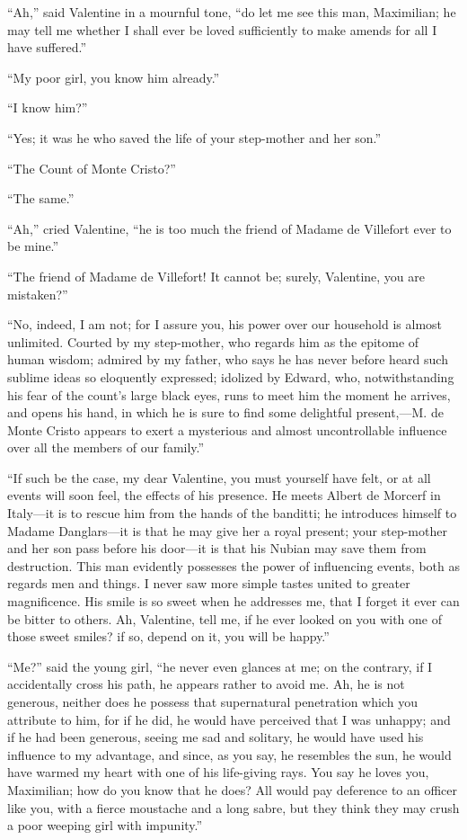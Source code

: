 “Ah,” said Valentine in a mournful tone, “do let me see this man,
Maximilian; he may tell me whether I shall ever be loved sufficiently
to make amends for all I have suffered.”

“My poor girl, you know him already.”

“I know him?”

“Yes; it was he who saved the life of your step-mother and her son.”

“The Count of Monte Cristo?”

“The same.”

“Ah,” cried Valentine, “he is too much the friend of Madame de
Villefort ever to be mine.”

“The friend of Madame de Villefort! It cannot be; surely, Valentine,
you are mistaken?”

“No, indeed, I am not; for I assure you, his power over our household
is almost unlimited. Courted by my step-mother, who regards him as the
epitome of human wisdom; admired by my father, who says he has never
before heard such sublime ideas so eloquently expressed; idolized by
Edward, who, notwithstanding his fear of the count’s large black eyes,
runs to meet him the moment he arrives, and opens his hand, in which he
is sure to find some delightful present,—M. de Monte Cristo appears to
exert a mysterious and almost uncontrollable influence over all the
members of our family.”

“If such be the case, my dear Valentine, you must yourself have felt,
or at all events will soon feel, the effects of his presence. He meets
Albert de Morcerf in Italy—it is to rescue him from the hands of the
banditti; he introduces himself to Madame Danglars—it is that he may
give her a royal present; your step-mother and her son pass before his
door—it is that his Nubian may save them from destruction. This man
evidently possesses the power of influencing events, both as regards
men and things. I never saw more simple tastes united to greater
magnificence. His smile is so sweet when he addresses me, that I forget
it ever can be bitter to others. Ah, Valentine, tell me, if he ever
looked on you with one of those sweet smiles? if so, depend on it, you
will be happy.”

“Me?” said the young girl, “he never even glances at me; on the
contrary, if I accidentally cross his path, he appears rather to avoid
me. Ah, he is not generous, neither does he possess that supernatural
penetration which you attribute to him, for if he did, he would have
perceived that I was unhappy; and if he had been generous, seeing me
sad and solitary, he would have used his influence to my advantage, and
since, as you say, he resembles the sun, he would have warmed my heart
with one of his life-giving rays. You say he loves you, Maximilian; how
do you know that he does? All would pay deference to an officer like
you, with a fierce moustache and a long sabre, but they think they may
crush a poor weeping girl with impunity.”

